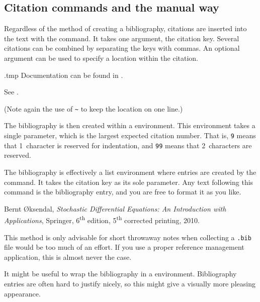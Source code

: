 %
\subsection{Citation commands and the manual way}\label{sec:bibliography manual}

Regardless of the method of creating a bibliography,
citations are inserted into the text with the  command.
It takes one argument, the citation key.
Several citations can be combined by separating the keys with commas.
An optional argument can be used to specify a location within the citation.

\begin{VerbatimOut}{\jobname.tmp}
Documentation can be found in
\cite{TLC, tikz}.

See \cite[Chapter~8]{TLC}.
\end{VerbatimOut}
\ShowExample
(Note again the use of \verb|~| to keep the location on one line.)

The bibliography is then created within a  environment.
This environment takes a single parameter,
which is the largest expected citation number.
That is, \verb|9| means that 1~character is reserved for indentation,
and \verb|99| means that 2~characters are reserved.

The bibliography is effectively a list environment
where entries are created by the  command.
It takes the citation key as its sole parameter.
Any text following this command is the bibliography entry,
and you are free to format it as you like.

\begin{ExampleCode}
\begin{thebibliography}{9}

    Bernt \O{}ksendal,
    \textit{Stochastic Differential Equations:
    An Introduction with Applications},
    Springer,
    6\textsuperscript{th} edition, 5\textsuperscript{th} corrected printing,
    2010.

\end{thebibliography}
\end{ExampleCode}

\begin{practices}
This method is only advisable for short throwaway notes
when collecting a \verb|.bib| file would be too much of an effort.
If you use a proper reference management application,
this is almost never the case.
\end{practices}

\begin{technote}
It might be useful to wrap the bibliography in a  environment.
Bibliography entries are often hard to justify nicely,
so this might give a visually more pleasing appearance.
\end{technote}



